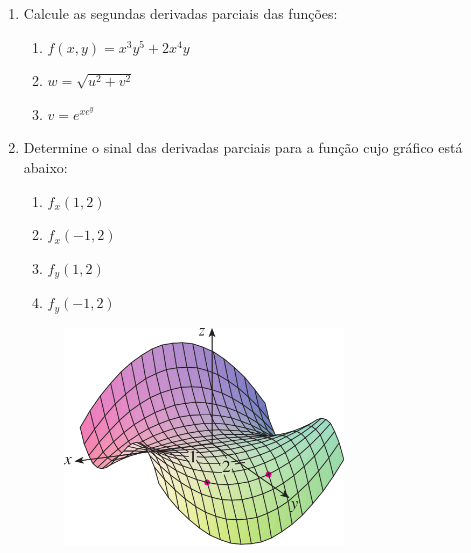 \documentclass[a4paper,5pt]{amsbook}
\begin{document}
\begin{enumerate}
    \item Calcule as segundas derivadas parciais das fun\c{c}\~oes:
        \begin{enumerate}
            \setlength\itemsep{0.2cm}
            \item $f(x,y) = x^3y^5+2x^4y$
            \item $w = \sqrt{u^2+v^2}$
            \item $v = e^{xe^y}$
        \end{enumerate}

    \item Determine o sinal das derivadas parciais para a fun\c{c}\~ao cujo gr\'afico
    est\'a abaixo:
        \begin{enumerate}
            \setlength\itemsep{0.2cm}
            \item $f_x(1,2)$
            \item $f_x(-1,2)$
            \item $f_y(1,2)$
            \item $f_y(-1,2)$
        \end{enumerate}
        \begin{figure}[h]
            \centering
            \includegraphics[width=0.7\textwidth]{lista-02-fig1.png}
        \end{figure}
\end{enumerate}
\end{document}
